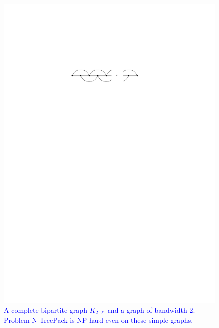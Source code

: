 \documentclass[runningheads]{llncs}
\newcommand{\xxxNTP}{{\sc N-TreePack}}
\newcommand{\lasse}[1]{\textcolor{blue}{#1}}
\begin{document}
\begin{figure}[htpb]
\includegraphics[scale=1]{img/bandwidth_2}
\caption{\lasse{A complete bipartite graph $K_{2,\ell}$ and a graph of bandwidth 2. Problem {\xxxNTP} is NP-hard even on these simple graphs.} }
\label{fig_easy_graphs}
\end{figure}
\end{document}
